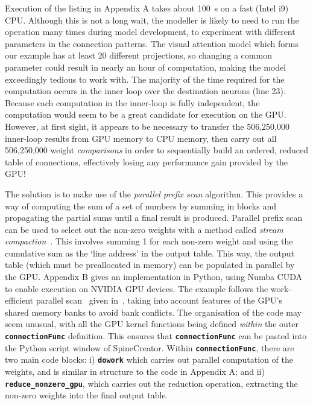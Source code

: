 \documentclass[12pt, a4paper]{article}
\newcommand{\code}[1]{\textbf{\texttt{#1}}}
\begin{document}
Execution of the listing in Appendix A takes about 100~s on a fast (Intel i9)
CPU. Although this is not a long wait, the modeller is likely to need to run
the operation many times during model development, to experiment with
different parameters in the connection patterns. The visual attention model
which forms our example has at least 20 different projections, so changing a
common parameter could result in nearly an hour of computation, making the
model exceedingly tedious to work with.  The majority of the time required for
the computation occurs in the inner loop over the destination neurons (line
23). Because each computation in the inner-loop is fully independent, the
computation would seem to be a great candidate for execution on the
GPU. However, at first sight, it appears to be necessary to transfer the
506,250,000 inner-loop results from GPU memory to CPU memory, then carry out
all 506,250,000 weight
\emph{comparisons} in order to sequentially build an ordered, reduced table of
connections, effectively losing any performance gain provided by the GPU!

The solution is to make use of the \emph{parallel prefix scan}
algorithm\cite{blelloch_prefix_1990}. This provides a way of computing the sum
of a set of numbers by summing in blocks and propagating the partial sums
until a final result is produced. Parallel prefix scan can be used to select
out the non-zero weights with a method called \emph{stream
compaction}~\cite{harris_chapter_2010}. This involves summing 1 for each
non-zero weight and using the cumulative sum as the `line address' in the
output table. This way, the output table (which must be preallocated in
memory) can be populated in parallel by the GPU. Appendix B gives an
implementation in Python, using Numba CUDA~\cite{anaconda_inc_numba_2012} to
enable execution on NVIDIA GPU devices. The example follows the work-efficient
parallel scan~\cite{blelloch_prefix_1990} given in~\cite{harris_chapter_2010},
taking into account features of the GPU's shared memory banks to avoid bank
conflicts. The organisation of the code may seem unusual, with all the GPU
kernel functions being defined \emph{within} the outer \code{connectionFunc}
definition. This ensures that
\code{connectionFunc} can be pasted into the Python script window of
SpineCreator. Within \code{connectionFunc}, there are two main code blocks:
i) \code{dowork} which carries out parallel computation of the weights, and is
similar in structure to the code in Appendix A; and
ii) \code{reduce\_nonzero\_gpu}, which carries out the reduction operation,
extracting the non-zero weights into the final output table.
\end{document}
